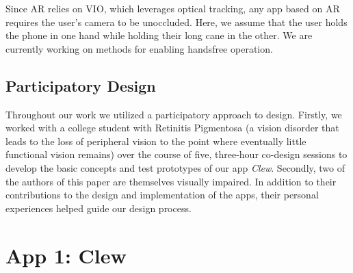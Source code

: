 \documentclass[chi_draft]{sigchi}
\begin{document}
Since AR relies on VIO, which leverages optical tracking, any app based on AR requires the user's camera to be unoccluded.  Here, we assume that the user holds the phone in one hand while holding their long cane in the other.  We are currently working on methods for enabling handsfree operation.

\subsection{Participatory Design}

Throughout our work we utilized a participatory approach to design.  Firstly, we worked with a college student with Retinitis Pigmentosa (a vision disorder that leads to the loss of peripheral vision to the point where eventually little functional vision remains) over the course of five, three-hour co-design sessions to develop the basic concepts and test prototypes of our app \emph{Clew}.   Secondly, two of the authors of this paper are themselves visually impaired.  In addition to their contributions to the design and implementation of the apps, their personal experiences helped guide our design process.

\section{App 1: Clew}
\end{document}
